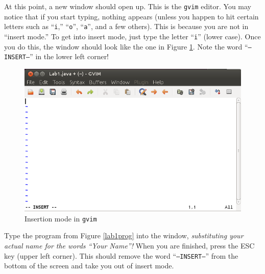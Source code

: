        At this point, a new window should open up. This is the {\tt gvim} editor.
       You may notice that if you start typing, nothing appears (unless you happen to
         hit certain letters such as ``{\tt i},'' ``{\tt o}'', ``{\tt a}'', and a few
         others). This is because you are not in ``insert mode.'' To get into insert mode,
       just type the letter ``{\tt i}'' (lower case). Once you do this, the window should 
       look like the one in Figure \ref{gvim-insert}. Note the word ``{\tt --INSERT--}''
       in the lower left corner!

       \begin{figure}[htbp]
         \centering
         \includegraphics[width=4.5in]{images/gvim-insert}
         \caption{Insertion mode in {\tt gvim}}
         \label{gvim-insert}
       \end{figure}

       Type the program from Figure
       \ref{lab1prog} into the window, {\em substituting your actual name for the words
         ``Your Name''!} When you are finished, press the ESC key (upper left corner).
       This should remove the word ``{\tt --INSERT--}'' from the bottom of the screen 
       and take you out of insert mode.

